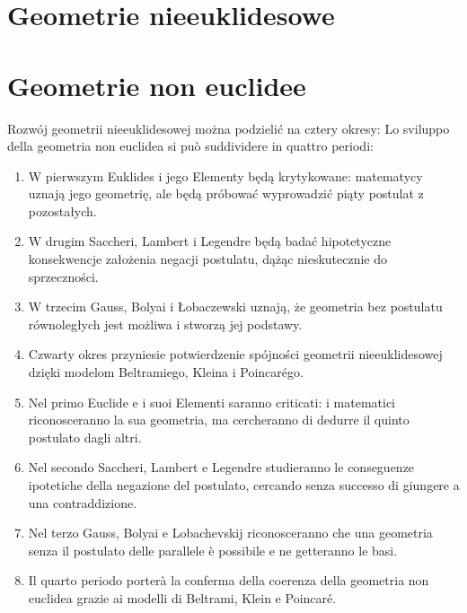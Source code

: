 %

\chapter{Geometrie nieeuklidesowe} %
\chapter{Geometrie non euclidee} %

Rozwój geometrii nieeuklidesowej można podzielić na cztery okresy: %
Lo sviluppo della geometria non euclidea si può suddividere in quattro periodi: %
\begin{enumerate}
    \item W pierwszym Euklides i jego Elementy będą krytykowane: matematycy uznają jego geometrię, ale będą próbować wyprowadzić piąty postulat z pozostałych. %
    \item W drugim Saccheri, Lambert i Legendre będą badać hipotetyczne konsekwencje założenia negacji postulatu, dążąc nieskutecznie do sprzeczności. %
    \item W trzecim Gauss, Bolyai i Łobaczewski uznają, że geometria bez postulatu równoległych jest możliwa i stworzą jej podstawy. %
    \item Czwarty okres przyniesie potwierdzenie spójności geometrii nieeuklidesowej dzięki modelom Beltramiego, Kleina i Poincarégo. %
    \item Nel primo Euclide e i suoi Elementi saranno criticati: i matematici riconosceranno la sua geometria, ma cercheranno di dedurre il quinto postulato dagli altri. %
    \item Nel secondo Saccheri, Lambert e Legendre studieranno le conseguenze ipotetiche della negazione del postulato, cercando senza successo di giungere a una contraddizione. %
    \item Nel terzo Gauss, Bolyai e Lobachevskij riconosceranno che una geometria senza il postulato delle parallele è possibile e ne getteranno le basi. %
    \item Il quarto periodo porterà la conferma della coerenza della geometria non euclidea grazie ai modelli di Beltrami, Klein e Poincaré. %
\end{enumerate}

